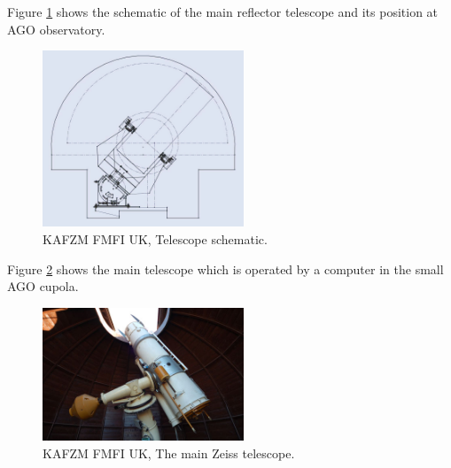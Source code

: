 	Figure \ref{fig:fmpiago1} shows the schematic of the main reflector telescope and its position at AGO observatory.
	
\begin{figure}[H]
  \centering
  \includegraphics[width=6cm]{images/FMPIAGO1}
  \caption{KAFZM FMFI UK, Telescope schematic.}
  \label{fig:fmpiago1}
\end{figure}

	Figure \ref{fig:fmpiago2} shows the main telescope which is operated by a computer in the small AGO cupola.

\begin{figure}[H]
\centering
  \includegraphics[width=6cm]{images/FMPIAGO2}
  \caption{KAFZM FMFI UK, The main Zeiss telescope.}
  \label{fig:fmpiago2}
\end{figure}